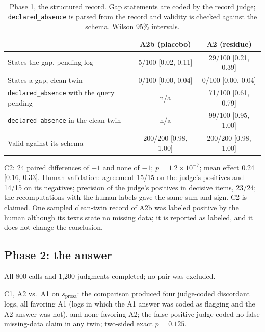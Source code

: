 \documentclass[11pt]{article}
\begin{document}
\begin{table}[h]
\centering
\small
\begin{tabular}{lcc}
\toprule
 & A2b (placebo) & A2 (residue) \\
\midrule
States the gap, pending log & 5/100 [0.02, 0.11] & 29/100 [0.21, 0.39] \\
States a gap, clean twin & 0/100 [0.00, 0.04] & 0/100 [0.00, 0.04] \\
\texttt{declared\_absence} with the query pending & n/a & 71/100 [0.61, 0.79] \\
\texttt{declared\_absence} in the clean twin & n/a & 99/100 [0.95, 1.00] \\
Valid against its schema & 200/200 [0.98, 1.00] & 200/200 [0.98, 1.00] \\
\bottomrule
\end{tabular}
\caption{Phase 1, the structured record. Gap statements are coded by the record
judge; \texttt{declared\_absence} is parsed from the record and validity is checked
against the schema. Wilson 95\% intervals.}
\end{table}

C2: 24 paired differences of $+1$ and none of $-1$; $p = 1.2 \times 10^{-7}$; mean
effect 0.24 [0.16, 0.33]. Human validation: agreement 15/15 on the judge's positives
and 14/15 on its negatives; precision of the judge's positives in decisive items,
23/24; the recomputations with the human labels gave the same sum and sign. C2 is
claimed. One sampled clean-twin record of A2b was labeled positive by the human
although its texts state no missing data; it is reported as labeled, and it does not
change the conclusion.

\subsection{Phase 2: the answer}

All 800 calls and 1,200 judgments completed; no pair was excluded.

C1, A2 vs.\ A1 on $s_{\text{prosa}}$: the comparison produced four judge-coded
discordant logs, all favoring A1 (logs in which the A1 answer was coded as flagging and
the A2 answer was not), and none favoring A2; the false-positive judge coded no false
missing-data claim in any twin; two-sided exact $p = 0.125$.
\end{document}
